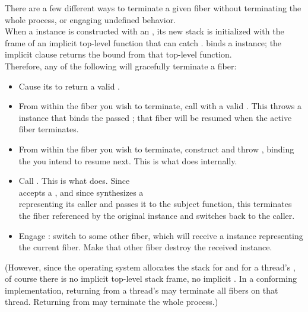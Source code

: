 
There are a few different ways to terminate a given fiber without
terminating the whole process, or engaging undefined behavior.\\

When a \fiber instance is constructed with an \entryfn, its new stack is
initialized with the frame of an implicit top-level function that can
catch \unwindex. \unwindex binds a \fiber instance; the implicit 
clause returns the bound \fiber from that top-level function.\\

Therefore, any of the following will gracefully terminate a fiber:

\begin{itemize}
    \item Cause its \entryfn\xspace to return a valid \fiber.
    \item From within the fiber you wish to terminate, call \unwindfib with a
          valid \fiber. This throws a \unwindex instance that binds the passed
          \fiber; that fiber will be resumed when the active fiber terminates.
    \item From within the fiber you wish to terminate, construct and
          throw \unwindex, binding the \fiber you intend to resume next. This
          is what \unwindfib does internally.
    \item Call . This is what \dtor
          does. Since\\\unwindfib accepts a \fiber, and since \resumewith
          synthesizes a\\\fiber representing its caller and passes it to the
          subject function, this terminates the fiber referenced by the
          original \fiber instance and switches back to the caller.
    \item Engage \dtor: switch to some other fiber, which will
          receive a \fiber instance representing the current fiber. Make that
          other fiber destroy the received \fiber instance.
\end{itemize}

(However, since the operating system allocates the stack for \main and for a
thread's \entryfn, of course there is no implicit top-level stack frame, no
implicit . In a conforming implementation,
returning from a thread's \entryfn\xspace may terminate all fibers on that
thread. Returning from \main may terminate the whole process.)\\

